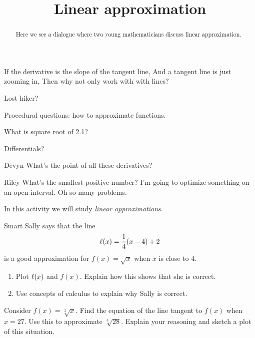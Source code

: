 \documentclass{ximera}
\title[Break-Ground:]{Linear approximation}
\begin{document}
\begin{abstract}
Here we see a dialogue where two young mathematicians discuss linear approximation.
\end{abstract}
\maketitle

If the derivative is the slope of the tangent line,
And a tangent line is just zooming in,
Then why not only work with with lines?




Lost hiker?

Procedural questions: how to approximate functions.

What is square root of 2.1?

Differentials?


\begin{dialogue}
\item[Devyn] 
What's the point of all these derivatives?
\item[Riley]
What's the smallest positive number?
I'm going to optimize something on an open interval.  Oh so many problems.
\end{dialogue}


In this activity we will study \textit{linear approximations}. 

\begin{problem}
Smart Sally says that the line
\[
\ell(x) = \frac{1}{4}(x-4)+2
\]
is a good approximation for $f(x) = \sqrt{x}$ when $x$ is close to
$4$. 
\begin{enumerate}
\item Plot $\ell(x)$ and $f(x)$. Explain how this shows that she is
correct.
\item Use concepts of calculus to explain why Sally is correct. 
\end{enumerate}
\end{problem}

\begin{problem}
Consider $f(x) = \sqrt[3]{x}$. Find the equation of the line tangent
to $f(x)$ when $x= 27$. Use this to approximate
$\sqrt[3]{28}$. Explain your reasoning and sketch a plot of this
situation.
\end{problem}
\end{document}
